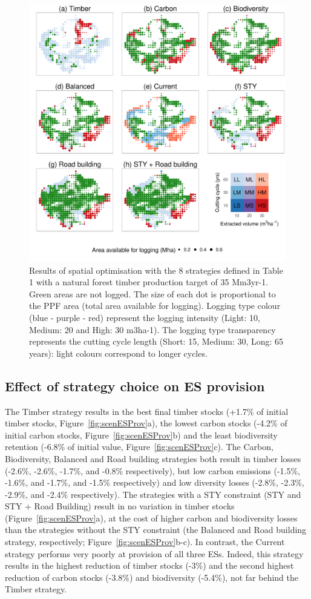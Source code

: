 \documentclass{article}
\begin{document}
\begin{figure}
    \centering
    \includegraphics[width=0.8\linewidth]{graphs/mapsScenarios.pdf}
    \caption{Results of spatial optimisation with the 8 strategies defined in Table 1 with a natural forest timber production target of 35 Mm3yr-1. Green areas are not logged. The size of each dot is proportional to the PPF area (total area available for logging). Logging type colour (blue - purple - red) represent the logging intensity (Light: 10, Medium: 20 and High: 30 m3ha-1). The logging type transparency represents the cutting cycle length (Short: 15, Medium: 30, Long: 65 years): light colours correspond to longer cycles.}
    \label{fig:mapsStrateg}
\end{figure}

\subsection{Effect of strategy choice on ES provision}

The Timber strategy results in the best final timber stocks (+1.7\% of initial timber stocks, Figure~\ref{fig:scenESProv}a), the lowest carbon stocks (-4.2\% of initial carbon stocks, Figure~\ref{fig:scenESProv}b) and the least biodiversity retention (-6.8\% of initial value, Figure~\ref{fig:scenESProv}c). The Carbon, Biodiversity, Balanced and Road building strategies both result in timber losses (-2.6\%, -2.6\%, -1.7\%, and -0.8\% respectively), but low carbon emissions (-1.5\%, -1.6\%, and -1.7\%, and -1.5\% respectively) and low diversity losses (-2.8\%, -2.3\%, -2.9\%, and -2.4\% respectively). The strategies with a STY constraint (STY and STY + Road Building) result in no variation in timber stocks (Figure~\ref{fig:scenESProv}a), at the cost of higher carbon and biodiversity losses than the strategies without the STY constraint (the Balanced and Road building strategy, respectively; Figure~\ref{fig:scenESProv}b-c). In contrast, the Current strategy performs very poorly at provision of all three ESs. Indeed, this strategy results in the highest reduction of timber stocks (-3\%) and the second highest reduction of carbon stocks (-3.8\%) and biodiversity (-5.4\%), not far behind the Timber strategy. 
\end{document}
